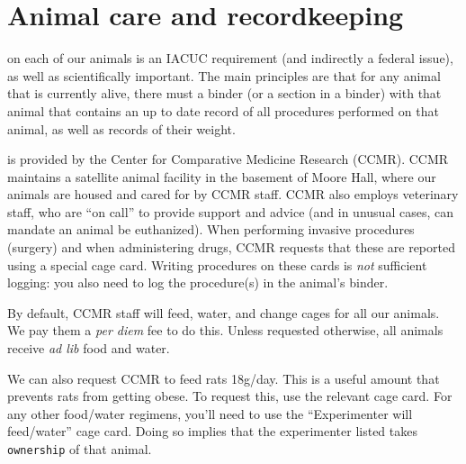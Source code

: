 \documentclass{tufte-book}
\newcommand{\doccls}[1]{\texttt{#1}}%
\begin{document}
\section{Animal care and recordkeeping}
\label{sec:animalcare}

 on each of our
animals is an IACUC requirement (and indirectly a federal issue), as
well as scientifically important. The main principles are that for any
animal that is currently alive, there must a binder (or a section in a
binder) with that animal that contains an up to date record of all
procedures performed on that animal, as well as records of their
weight.

 is provided by the Center for
Comparative Medicine Research (CCMR). CCMR maintains a satellite
animal facility in the basement of Moore Hall, where our animals are
housed and cared for by CCMR staff. CCMR also employs veterinary
staff, who are ``on call'' to provide support and advice (and in
unusual cases, can mandate an animal be euthanized). When performing
invasive procedures (surgery) and when administering drugs, CCMR
requests that these are reported using a special cage
card. Writing procedures on
these cards is {\it not} sufficient logging: you also need to log the
procedure(s) in the animal's binder.

By default, CCMR staff will feed, water, and change cages for all our
animals. We pay them a {\it per diem} fee to do this. Unless requested
otherwise, all animals receive {\it ad lib} food and water.

We can also request CCMR to feed rats 18g/day. This is a useful amount
that prevents rats from getting obese. To request this, use the
relevant cage card. For any other food/water
regimens, you'll need to use the ``Experimenter will feed/water'' cage
card. Doing so implies that the experimenter listed takes
\doccls{ownership} of that animal.
\end{document}
